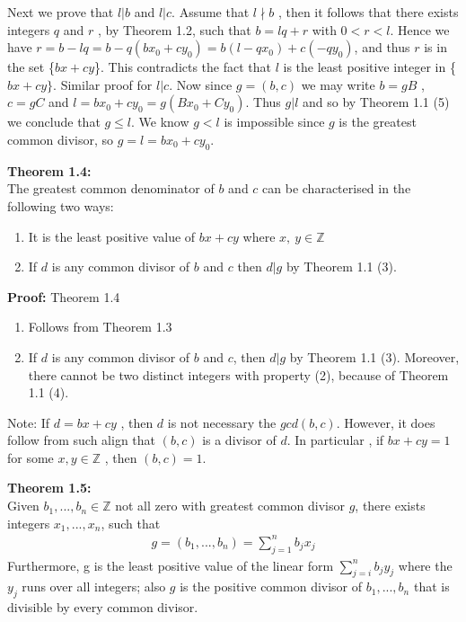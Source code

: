\documentclass[a4paper]{article}
\begin{document}
Next we prove that $l|b$ and $l|c$. Assume that $l \nmid b$ , then it follows that there exists integers $q$ and $r$ , by Theorem 1.2, such that $b=lq+r$ with $0<r<l$. Hence we have $r=b-lq=b-q(bx_0+cy_0)=b(l-qx_0)+c(-qy_0)$, and thus $r$ is in the set \{$bx+cy$\}. This contradicts the fact that $l$ is the least positive integer in \{$bx+cy\}$. Similar proof for $l|c$. Now since $g=(b,c)$ we may write $b=gB$ , $c=gC$ and $l=bx_0+cy_0=g(Bx_0+Cy_0)$. Thus $g|l $ and so by Theorem 1.1 (5) we conclude that $g \leq l$. We know $g<l$ is impossible since $g$ is the greatest common divisor, so $g=l=bx_0+cy_0$.


\textbf{Theorem 1.4:}\\
The greatest common denominator of $b$ and $c$ can be characterised in the following two ways:
\begin{enumerate}
    \item It is the least positive value of $bx+cy$ where $x,\ y\in\mathbb{Z}$
    \item If $d$ is any common divisor of $b$ and $c$ then $d|g$ by Theorem 1.1 (3).
\end{enumerate}

\textbf{Proof:} Theorem 1.4

\begin{enumerate}
\item Follows from Theorem 1.3
\item If $d$ is any common divisor of $b$ and $c$, then $d|g$ by Theorem 1.1 (3). Moreover, there cannot be two distinct integers with property (2), because of Theorem 1.1 (4).
\end{enumerate}

Note: If $d=bx+cy$ , then $d$ is not necessary the $gcd(b,c)$. However, it does follow from such align that $(b,c)$ is a divisor of $d$. In particular , if $bx+cy=1$ for some $x,y\in\mathbb{Z}$ , then $(b,c)=1$.

\textbf{Theorem 1.5:}\\
Given $b_1,...,b_n\in\mathbb{Z}$ not all zero with greatest common divisor $g$, there exists integers $x_1,...,x_n$,  such that
\begin{align}
    g=(b_1,...,b_n)=\sum^n_{j=1}b_jx_j
\end{align}
Furthermore, g is the least positive value of the linear form $\sum^n_{j=i}b_jy_j$ where the $y_j$ runs over all integers; also $g$ is the positive common divisor of $b_1,...,b_n$ that is divisible by every common divisor.
\end{document}
